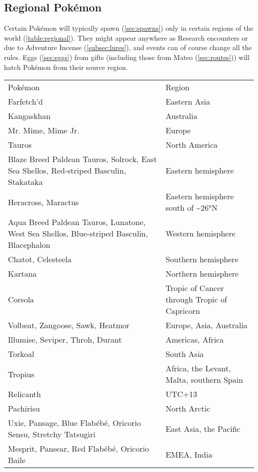 \subsection{Regional Pokémon\label{subsec:regional}}
Certain Pokémon will typically spawn (\autoref{sec:spawns}) only in certain regions of the world (\autoref{table:regional}).
They might appear anywhere as Research encounters or due to Adventure Incense (\autoref{subsec:lures}),
 and events can of course change all the rules.
Eggs (\autoref{sec:eggs}) from gifts (including those from Mateo (\autoref{sec:routes})) will
 hatch Pokémon from their source region.
\begin{table}
\centering
\footnotesize
  \begin{tabular}{p{}l}
Pokémon & Region \\
\Midrule
Farfetch'd & Eastern Asia\\
\rowcolor{Gray!25}
Kangaskhan & Australia\\
Mr. Mime, Mime Jr. & Europe\\
\rowcolor{Gray!25}
Tauros & North America\\
Blaze Breed Paldean Tauros, Solrock, East Sea Shellos, Red-striped Basculin, Stakataka & Eastern hemisphere\\
\rowcolor{Gray!25}
Heracross, Maractus & Eastern hemisphere south of \textasciitilde\ang{26}N\\
Aqua Breed Paldean Tauros, Lunatone, West Sea Shellos, Blue-striped Basculin, Blacephalon & Western hemisphere\\
\rowcolor{Gray!25}
Chatot, Celesteela & Southern hemisphere\\
Kartana & Northern hemisphere\\
\rowcolor{Gray!25}
Corsola & Tropic of Cancer through Tropic of Capricorn\\
Volbeat, Zangoose, Sawk, Heatmor & Europe, Asia, Australia\\
\rowcolor{Gray!25}
Illumise, Seviper, Throh, Durant & Americas, Africa\\
Torkoal & South Asia\\
\rowcolor{Gray!25}
Tropius & Africa, the Levant, Malta, southern Spain\\
Relicanth & UTC+13\\
\rowcolor{Gray!25}
Pachirisu & North Arctic\\
Uxie, Pansage, Blue Flabébé, Oricorio Sensu, Stretchy Tatsugiri & East Asia, the Pacific\\
\rowcolor{Gray!25}
Mesprit, Pansear, Red Flabébé, Oricorio Baile & EMEA, India\\

\end{tabular}
\end{table}
